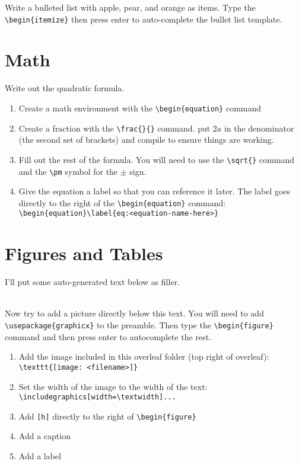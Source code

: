         Write a bulleted list with apple, pear, and orange as items. Type the \verb"\begin{itemize}" then press enter to auto-complete the bullet list template.

    \section{Math}
    Write out the quadratic formula.
    \begin{enumerate}
        \item Create a math environment with the \verb"\begin{equation}" command
        \item Create a fraction with the \verb"\frac{}{}" command. put $2a$ in the denominator (the second set of brackets) and compile to ensure things are working.
        \item Fill out the rest of the formula. You will need to use the \verb"\sqrt{}" command and the \verb"\pm" symbol for the $\pm$ sign.
        \item Give the equation a label so that you can reference it later. The label goes directly to the right of the \verb"\begin{equation}" command: \verb"\begin{equation}\label{eq:<equation-name-here>}"
    \end{enumerate}



    \section{Figures and Tables}
    I'll put some auto-generated text below as filler.

    \lipsum[1]\\

    Now try to add a picture directly below this text. You will need to add \verb"\usepackage{graphicx}" to the preamble. Then type the \verb"\begin{figure}" command and then press enter to autocomplete the rest.

    \begin{enumerate}
        \item Add the image included in this overleaf folder (top right of overleaf): \verb"\texttt{[image: <filename>]}"
        \item Set the width of the image to the width of the text:\\    \verb"\includegraphics[width=\textwidth]..."
        \item Add \verb"[h]" directly to the right of \verb"\begin{figure}" 
        \item Add a caption
        \item Add a label
    \end{enumerate}

